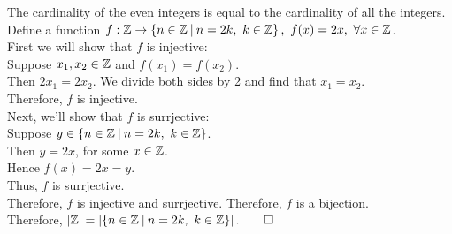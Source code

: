 \documentclass{report}
\begin{document}
\Lemma The cardinality of the even integers is equal to the cardinality of all the integers.
\proof Define a function $f:\bbz\to\braces{n\in\bbz\suchthat n=2k,\ k\in\bbz},\ f(x)=2x,\ \forall x\in\bbz$. \\
First we will show that $f$ is injective: \\
Suppose $x_1,x_2\in\mathbb{Z}$ and $f(x_1)=f(x_2)$. \\
Then $2x_1 = 2x_2$. We divide both sides by 2 and find that $x_1=x_2$. \\
Therefore, $f$ is injective. \\
Next, we'll show that $f$ is surrjective: \\
Suppose $y\in\braces{n\in\bbz\suchthat n=2k,\ k\in\bbz}$. \\
Then $y=2x$, for some $x\in\mathbb{Z}$. \\
Hence $f(x) = 2x = y$. \\
Thus, $f$ is surrjective. \\
Therefore, $f$ is injective and surrjective. Therefore, $f$ is a bijection. \\
Therefore, $\abs{\bbz} = \abs{\braces{n\in\bbz\suchthat n=2k,\ k\in\bbz}}. \QED$
	
\end{document}
